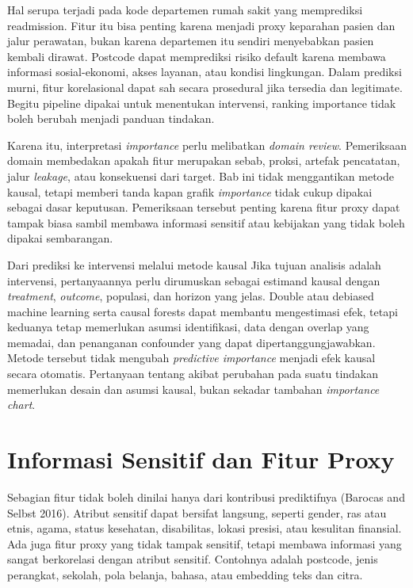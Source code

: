Hal serupa terjadi pada kode departemen rumah sakit yang memprediksi readmission. Fitur itu bisa penting karena menjadi proxy keparahan pasien dan jalur perawatan, bukan karena departemen itu sendiri menyebabkan pasien kembali dirawat. Postcode dapat memprediksi risiko default karena membawa informasi sosial-ekonomi, akses layanan, atau kondisi lingkungan. Dalam prediksi murni, fitur korelasional dapat sah secara prosedural jika tersedia dan legitimate. Begitu pipeline dipakai untuk menentukan intervensi, ranking importance tidak boleh berubah menjadi panduan tindakan.

Karena itu, interpretasi \emph{importance} perlu melibatkan \emph{domain review}. Pemeriksaan domain membedakan apakah fitur merupakan sebab, proksi, artefak pencatatan, jalur \emph{leakage}, atau konsekuensi dari target. Bab ini tidak menggantikan metode kausal, tetapi memberi tanda kapan grafik \emph{importance} tidak cukup dipakai sebagai dasar keputusan. Pemeriksaan tersebut penting karena fitur proxy dapat tampak biasa sambil membawa informasi sensitif atau kebijakan yang tidak boleh dipakai sembarangan.

\begin{pendalaman}{Dari prediksi ke intervensi melalui metode kausal}
Jika tujuan analisis adalah intervensi, pertanyaannya perlu dirumuskan sebagai estimand kausal dengan \emph{treatment}, \emph{outcome}, populasi, dan horizon yang jelas. Double atau debiased machine learning serta causal forests dapat membantu mengestimasi efek, tetapi keduanya tetap memerlukan asumsi identifikasi, data dengan overlap yang memadai, dan penanganan confounder yang dapat dipertanggungjawabkan. Metode tersebut tidak mengubah \emph{predictive importance} menjadi efek kausal secara otomatis. Pertanyaan tentang akibat perubahan pada suatu tindakan memerlukan desain dan asumsi kausal, bukan sekadar tambahan \emph{importance chart}.
\end{pendalaman}

\section{Informasi Sensitif dan Fitur Proxy}\label{informasi-sensitif-dan-fitur-proxy}

Sebagian fitur tidak boleh dinilai hanya dari kontribusi prediktifnya (Barocas and Selbst 2016). Atribut sensitif dapat bersifat langsung, seperti gender, ras atau etnis, agama, status kesehatan, disabilitas, lokasi presisi, atau kesulitan finansial. Ada juga fitur proxy yang tidak tampak sensitif, tetapi membawa informasi yang sangat berkorelasi dengan atribut sensitif. Contohnya adalah postcode, jenis perangkat, sekolah, pola belanja, bahasa, atau embedding teks dan citra.

